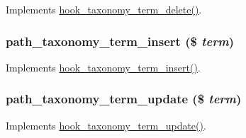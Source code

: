 \label{path_8module_ad281728f6950698548fbe837b9e17444}
Implements \hyperlink{group__hooks_gab55fa1f290f3d43ea59795123154cf32}{hook\_\-taxonomy\_\-term\_\-delete()}. \hypertarget{path_8module_afbd7116ea85d002c8aeb2c779db810d2}{
\subsubsection[{path\_\-taxonomy\_\-term\_\-insert}]{\setlength{\rightskip}{0pt plus 5cm}path\_\-taxonomy\_\-term\_\-insert (\$ {\em term})}}
\label{path_8module_afbd7116ea85d002c8aeb2c779db810d2}
Implements \hyperlink{group__hooks_gabab3537accc8ce17fe2cd0f73f4bb817}{hook\_\-taxonomy\_\-term\_\-insert()}. \hypertarget{path_8module_abd04de55f3d2a8aa640441efcfd3e70c}{
\subsubsection[{path\_\-taxonomy\_\-term\_\-update}]{\setlength{\rightskip}{0pt plus 5cm}path\_\-taxonomy\_\-term\_\-update (\$ {\em term})}}
\label{path_8module_abd04de55f3d2a8aa640441efcfd3e70c}
Implements \hyperlink{group__hooks_ga5c2477516245f0b9d6b04b8a8d227592}{hook\_\-taxonomy\_\-term\_\-update()}. 